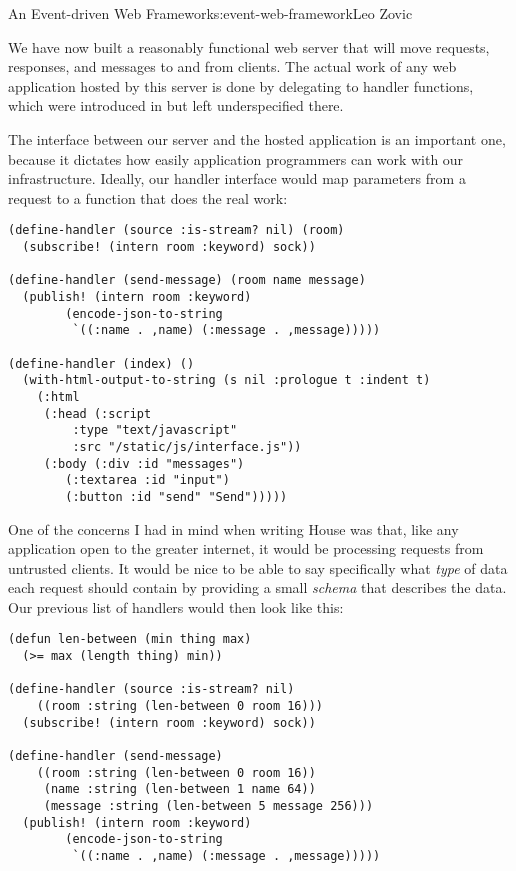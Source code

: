 \begin{aosachapter}{An Event-driven Web Framework}{s:event-web-framework}{Leo Zovic}
\label{extending-the-server-into-a-web-framework}

We have now built a reasonably functional web server that will move
requests, responses, and messages to and from clients. The actual work
of any web application hosted by this server is done by delegating to
handler functions, which were introduced in
 but left underspecified there.

The interface between our server and the hosted application is an
important one, because it dictates how easily application programmers
can work with our infrastructure. Ideally, our handler interface would
map parameters from a request to a function that does the real work:

\begin{verbatim}
(define-handler (source :is-stream? nil) (room)
  (subscribe! (intern room :keyword) sock))

(define-handler (send-message) (room name message)
  (publish! (intern room :keyword)
        (encode-json-to-string
         `((:name . ,name) (:message . ,message)))))

(define-handler (index) ()
  (with-html-output-to-string (s nil :prologue t :indent t)
    (:html
     (:head (:script
         :type "text/javascript"
         :src "/static/js/interface.js"))
     (:body (:div :id "messages")
        (:textarea :id "input")
        (:button :id "send" "Send")))))
\end{verbatim}

One of the concerns I had in mind when writing House was that, like any
application open to the greater internet, it would be processing
requests from untrusted clients. It would be nice to be able to say
specifically what \emph{type} of data each request should contain by
providing a small \emph{schema} that describes the data. Our previous
list of handlers would then look like this:

\begin{verbatim}
(defun len-between (min thing max)
  (>= max (length thing) min))

(define-handler (source :is-stream? nil)
    ((room :string (len-between 0 room 16)))
  (subscribe! (intern room :keyword) sock))

(define-handler (send-message)
    ((room :string (len-between 0 room 16))
     (name :string (len-between 1 name 64))
     (message :string (len-between 5 message 256)))
  (publish! (intern room :keyword)
        (encode-json-to-string
         `((:name . ,name) (:message . ,message)))))


\end{verbatim}
\end{aosachapter}
